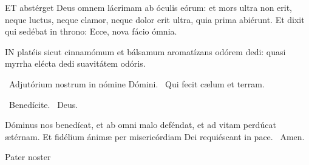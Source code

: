 
\lettrine[lines=2]{E}{T} abstérget Deus omnem lácrimam ab óculis eórum: et mors ultra non erit, neque luctus, neque clamor, neque dolor erit ultra, quia prima abiérunt. Et dixit qui sedébat in throno: Ecce, nova fácio ómnia.


\lettrine[lines=2]{I}{N} platéis sicut cinnamómum et bálsamum aromatízans odórem dedi: quasi myrrha elécta dedi suavitátem odóris.

\V\ Adjutórium nostrum in nómine Dómini. \R\ Qui fecit cælum et terram.

\V\ Benedícite. \R\ Deus.

 Dóminus nos benedícat, et ab omni malo deféndat, et ad vitam perdúcat ætérnam. Et fidélium ánimæ per misericórdiam Dei requiéscant in pace. \R\ Amen.

 Pater noster 


